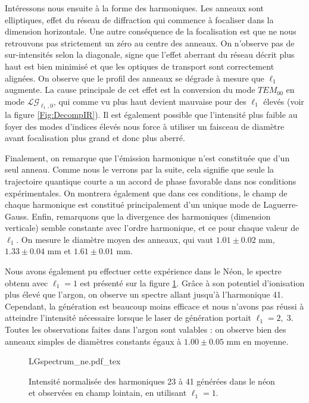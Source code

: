 Intéressons nous ensuite à la forme des harmoniques. Les anneaux sont elliptiques, effet du réseau de diffraction qui commence à focaliser dans la dimension horizontale. Une autre conséquence de la focalisation est que ne nous retrouvons pas strictement un zéro au centre des anneaux. On n'observe pas de sur-intensités selon la diagonale, signe que l'effet aberrant du réseau décrit plus haut est bien minimisé et que les optiques de transport sont correctement alignées.
On observe que le profil des anneaux se dégrade à mesure que $\ell_{1}$ augmente. La cause principale de cet effet est la conversion du mode $TEM_{00}$ en mode $\mathcal{LG}_{\ell_{1},0}$, qui comme vu plus haut devient mauvaise pour des $\ell_1$ élevés (voir la figure \ref{Fig:DecompIR}). Il est également possible que l'intensité plus faible au foyer des modes d'indices élevés nous force à utiliser un faisceau de diamètre avant focalisation plus grand et donc plus aberré.

Finalement, on remarque que l'émission harmonique n'est constituée que d'un seul anneau. Comme nous le verrons par la suite, cela signifie que seule la trajectoire quantique courte a un accord de phase favorable dans nos conditions expérimentales. On montrera également que dans ces conditions, le champ de chaque harmonique est constitué principalement d'un unique mode de Laguerre-Gauss. Enfin, remarquons que la divergence des harmoniques (dimension verticale) semble constante avec l'ordre harmonique, et ce pour chaque valeur de $\ell_{1}$. On mesure le diamètre moyen des anneaux, qui vaut $1.01\pm 0.02$ mm, $1.33\pm 0.04$ mm et $1.61\pm 0.01$ mm. 

Nous avons également pu effectuer cette expérience dans le Néon, le spectre obtenu avec $\ell_1=1$ est présenté sur la figure \ref{Fig:LGSpectrumNe}. Grâce à son potentiel d'ionisation plus élevé que l'argon, on observe un spectre allant jusqu'à l'harmonique 41. Cependant, la génération est beaucoup moins efficace et nous n'avons pas réussi à atteindre l'intensité nécessaire lorsque le laser de génération portait $\ell_1=2,\;3$. Toutes les observations faites dans l'argon sont valables : on observe bien des anneaux simples de diamètres constants égaux à $1.00\pm 0.05$ mm en moyenne.

\begin{figure}[!ht]
\centering
\def\svgwidth{1\columnwidth}
{LGspectrum_ne.pdf_tex}
\caption{Intensité normalisée des harmoniques 23 à 41 générées dans le néon et observées en champ lointain, en utilisant $\ell_{1} = 1$.}
\label{Fig:LGSpectrumNe}
\end{figure}

